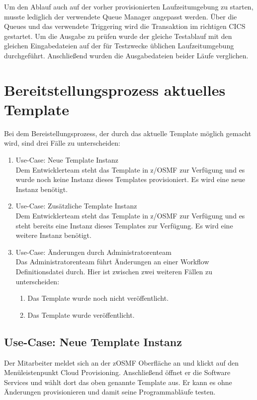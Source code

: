 Um den Ablauf auch auf der vorher provisionierten Laufzeitumgebung zu starten, musste lediglich der verwendete Queue Manager angepasst werden.
Über die Queues und das verwendete Triggering wird die Transaktion im richtigen CICS gestartet.
Um die Ausgabe zu prüfen wurde der gleiche Testablauf mit den gleichen Eingabedateien auf der für Testzwecke üblichen Laufzeitumgebung durchgeführt.
Anschließend wurden die Ausgabedateien beider Läufe verglichen.

\section{Bereitstellungsprozess aktuelles Template}\label{sec:akttemp}
Bei dem Bereistellungsprozess, der durch das aktuelle Template möglich gemacht wird, sind drei Fälle zu unterscheiden:

\begin{samepage}
\begin{enumerate}
\item Use-Case: Neue Template Instanz\\
Dem Entwicklerteam steht das Template in z/OSMF zur Verfügung und es wurde noch keine Instanz dieses Templates provisioniert.
Es wird eine neue Instanz benötigt.
\item Use-Case: Zusätzliche Template Instanz\\
Dem Entwicklerteam steht das Template in z/OSMF zur Verfügung und es steht bereits eine Instanz dieses Templates zur Verfügung.
Es wird eine weitere Instanz benötigt.
\item Use-Case: Änderungen durch Administratorenteam\\
Das Administratorenteam führt Änderungen an einer Workflow Definitionsdatei durch.
Hier ist zwischen zwei weiteren Fällen zu unterscheiden:
\begin{enumerate}
\item Das Template wurde noch nicht veröffentlicht.
\item Das Template wurde veröffentlicht.
\end{enumerate}
\end{enumerate}
\end{samepage}

\subsection{Use-Case: Neue Template Instanz}
Der Mitarbeiter meldet sich an der zOSMF Oberfläche an und klickt auf den Menüleistenpunkt \glqq Cloud Provisioning\grqq.
Anschließend öffnet er die \glqq Software Services\grqq{} und wählt dort das oben genannte Template aus.
Er kann es ohne Änderungen provisionieren und damit seine Programmabläufe testen.

